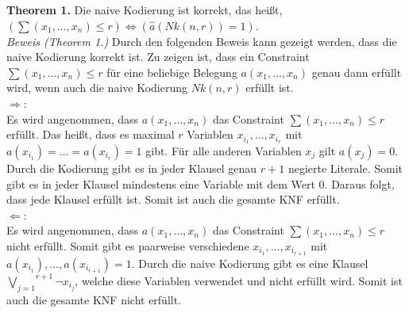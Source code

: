 \documentclass[a4,abstract=on]{scrartcl}
\begin{document}
\textbf{Theorem 1.} Die naive Kodierung ist korrekt, das heißt, $(\sum (x_1, \dots, x_n)\allowbreak \leq r) \Leftrightarrow (\hat{a} (Nk(n,r)) = 1)$.\\
\newline
\textit{Beweis (Theorem 1.)} Durch den folgenden Beweis kann gezeigt werden, dass die naive Kodierung korrekt ist. Zu zeigen ist, dass ein Constraint $\sum(x_1, \dots,x_n) \leq r$ für eine beliebige Belegung $a(x_1, \dots ,x_n)$ genau dann erfüllt wird, wenn auch die naive Kodierung $Nk(n, r)$ erfüllt ist.\\
\glqq$\Rightarrow$\grqq:\\
Es wird angenommen, dass $a(x_1, \dots ,x_n)$ das Constraint $\sum(x_1, \dots,x_n)\allowbreak \leq r$ erfüllt. Das heißt, dass es maximal $r$ Variablen $x_{i_1}, \dots, x_{i_r}$ mit $a(x_{i_1}) =\allowbreak \dots = a(x_{i_r}) = 1$ gibt. Für alle anderen Variablen $x_j$ gilt $a(x_j) = 0$. Durch die Kodierung gibt es in jeder Klausel genau $r+1$ negierte Literale. Somit gibt es in jeder Klausel mindestens eine Variable mit dem Wert $0$. Daraus folgt, dass jede Klausel erfüllt ist. Somit ist auch die gesamte KNF erfüllt.\\
\glqq$\Leftarrow$\grqq:\\
Es wird angenommen, dass $a(x_1, \dots ,x_n)$ das Constraint $\sum(x_1, \dots,x_n)\allowbreak \leq r$ nicht erfüllt. Somit gibt es paarweise verschiedene $x_{i_1}, \dots, x_{i_{r+1}}$ mit $a(x_{i_1}), \dots ,a(x_{i_{r+1}}) = 1$. Durch die naive Kodierung gibt es eine Klausel $\overset{r+1}{\underset{j=1}{\bigvee}} {\neg x_{i_j}}$, welche diese Variablen verwendet und nicht erfüllt wird. Somit ist auch die gesamte KNF nicht erfüllt.\\
 \qedsymbol
\end{document}
